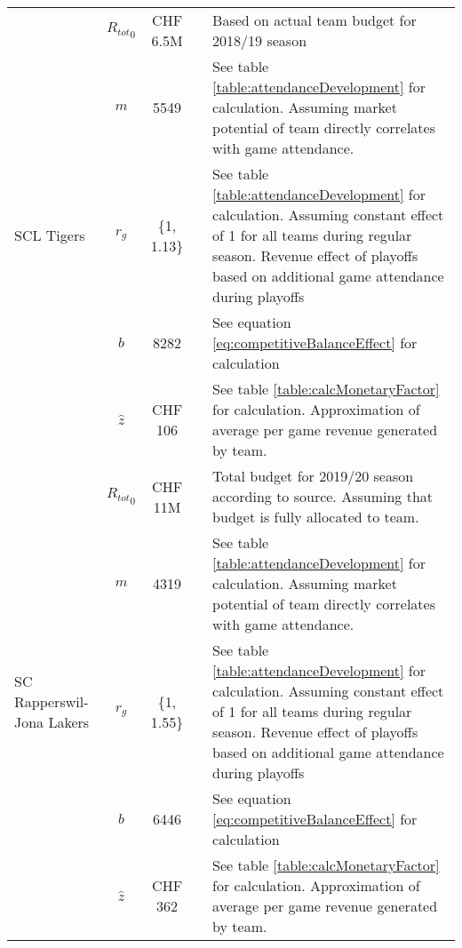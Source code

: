 \begin{longtable}[h!]{p{1.5cm}cc>{\baselineskip=13pt}p{3cm}>{\baselineskip=13pt}p{5.5cm}}
    \multirow[t]{5}{=}{SCL Tigers} & ${R_{tot}}_{0}$ & CHF 6.5M & \cite{germann_mir_2018} & Based on actual team budget for 2018/19 season \\
                                     & $m$ & 5549 & \cite{national_league_zuschauerzahlen_2022} & See table \ref{table:attendanceDevelopment} for calculation. Assuming market potential of team directly correlates with game attendance. \\
                                     & $r_g$ & \{1, 1.13\} & \cite{national_league_zuschauerzahlen_2022} & See table \ref{table:attendanceDevelopment} for calculation. Assuming constant effect of 1 for all teams during regular season. Revenue effect of playoffs based on additional game attendance during playoffs \\
                                     & $b$ & 8282 &  & See equation \ref{eq:competitiveBalanceEffect} for calculation \\
                                     & $\hat{z}$ & CHF 106 &  &  See table \ref{table:calcMonetaryFactor} for calculation. Approximation of average per game revenue generated by team. \\
    \midrule
    
    \multirow[t]{5}{=}{SC Rapperswil-Jona Lakers} & ${R_{tot}}_{0}$ & CHF 11M & \cite{umberg_cup_2019} & 
    Total budget for 2019/20 season according to source. Assuming that budget is fully allocated to team. \\
                                                 & $m$ & 4319 & \cite{national_league_zuschauerzahlen_2022} & See table \ref{table:attendanceDevelopment} for calculation. Assuming market potential of team directly correlates with game attendance. \\
                                                 & $r_g$ & \{1, 1.55\} & \cite{national_league_zuschauerzahlen_2022} &  See table \ref{table:attendanceDevelopment} for calculation. Assuming constant effect of 1 for all teams during regular season. Revenue effect of playoffs based on additional game attendance during playoffs \\
                                                 & $b$ & 6446 &  & See equation \ref{eq:competitiveBalanceEffect} for calculation \\
                                                 & $\hat{z}$ & CHF 362 &  & See table \ref{table:calcMonetaryFactor} for calculation. Approximation of average per game revenue generated by team. \\
    \midrule    
    

\end{longtable}
